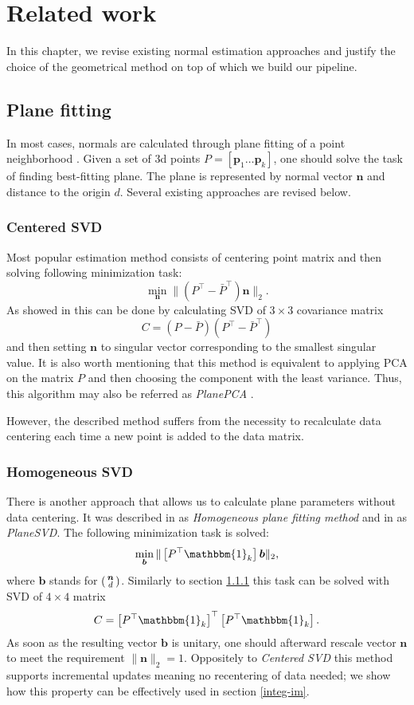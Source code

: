 \chapter{Related work}
In this chapter, we revise existing normal estimation approaches and justify the choice of the geometrical method on top of which we build our pipeline.

\section{Plane fitting}
In most cases, normals are calculated through plane fitting of a point neighborhood \cite{normal_est}. Given a set of 3d points $P = \left[\bm{p}_1 \dots \bm{p}_k\right]$, one should solve the task of finding best-fitting plane. The plane is represented by normal vector $\bm{n}$ and distance to the origin $d$. Several existing approaches are revised below.

\subsection{Centered SVD} \label{center-svd}
Most popular estimation method consists of centering point matrix and then solving following minimization task:
\[
\min_{\bm{n}} \| \left(P^\top - \bar{P}^\top \right) \bm{n} \|_2.
\]
As showed in \cite{ferrer, surface_rec} this can be done by calculating SVD of $3 \times 3$ covariance matrix
\[
C = \left(P - \bar{P}\right) \left(P^\top - \bar{P}^\top \right)
\]
and then setting $\bm{n}$ to singular vector corresponding to the smallest singular value. It is also worth mentioning that this method is equivalent to applying PCA on the matrix $P$ and then choosing the component with the least variance. Thus, this algorithm may also be referred as \textit{PlanePCA} \cite{normal_est}.

However, the described method suffers from the necessity to recalculate data centering each time a new point is added to the data matrix.

\subsection{Homogeneous SVD} \label{homog-svd}
There is another approach that allows us to calculate plane parameters without data centering. It was described in \cite{ferrer} as \textit{Homogeneous plane fitting method} and in \cite{normal_est} as \textit{PlaneSVD}.
The following minimization task is solved:
\[
\min_{\bm{b}} \| \left[P^\top \mathbbm{1}_k \right] \bm{b} \|_2,
\]
where $\bm{b}$ stands for $\begin{psmallmatrix}
\bm{n} \\
d
\end{psmallmatrix}$. Similarly to section \ref{center-svd} this task can be solved with SVD of $4 \times 4$ matrix
\[
C = \left[P^\top \mathbbm{1}_k \right]^\top \left[P^\top \mathbbm{1}_k \right].
\]
As soon as the resulting vector $\bm{b}$ is unitary, one should afterward rescale vector $\bm{n}$ to meet the requirement $\|\bm{n}\|_2 = 1$. Oppositely to \textit{Centered SVD} this method supports incremental updates meaning no recentering of data needed; we show how this property can be effectively used in section \ref{integ-im}.


